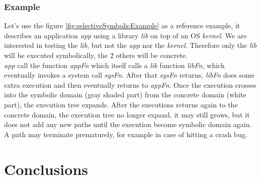\documentclass[11pt]{article}
\begin{document}
    	
    	
    	\subsubsection{Example}
    	\label{subsec:S2EExample}
    		Let's use the figure \ref{fig:selectiveSymbolicExample} as a reference example, it describes an application \emph{app} using a library \emph{lib} on top of an OS \emph{kernel}. We are interested in testing the \emph{lib}, but not the \emph{app} nor the \emph{kernel}. Therefore only the \emph{lib} will be executed symbolically, the 2 others will be concrete.\\
    		
    		\emph{app} call the function \emph{appFn} which itself calls a \emph{lib} function \emph{libFn}, which eventually invokes a system call \emph{sysFn}. After that \emph{sysFn} returns, \emph{libFn} does some extra execution and then eventually returns to \emph{appFn}. Once the execution crosses into the symbolic domain (gray shaded part) from the concrete domain (white part), the execution tree expands. After the executions returns again to the concrete domain, the execution tree no longer expand, it may still grows, but it does not add any new paths until the execution become symbolic domain again. A path may terminate prematurely, for example in case of hitting a crash bug.


  \section{Conclusions}


\pagebreak
{}

\end{document}
